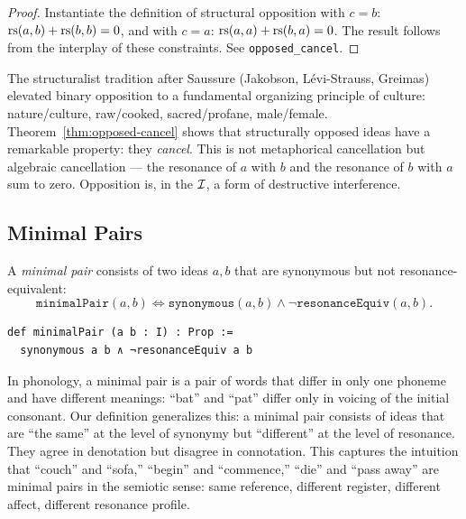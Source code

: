 \begin{proof}
Instantiate the definition of structural opposition with $c = b$:
$\mathrm{rs}(a, b) + \mathrm{rs}(b, b) = 0$, and with $c = a$:
$\mathrm{rs}(a, a) + \mathrm{rs}(b, a) = 0$. The result follows from the interplay
of these constraints. See \texttt{opposed\_cancel}.
\end{proof}

\begin{interpretation}
The structuralist tradition after Saussure (Jakobson, L\'evi-Strauss,
Greimas) elevated binary opposition to a fundamental organizing
principle of culture: nature/culture, raw/cooked, sacred/profane,
male/female. Theorem~\ref{thm:opposed-cancel} shows that structurally
opposed ideas have a remarkable property: they \emph{cancel}. This is
not metaphorical cancellation but algebraic cancellation --- the
resonance of $a$ with $b$ and the resonance of $b$ with $a$ sum to
zero. Opposition is, in the $\mathcal{I}$, a form of destructive interference.
\end{interpretation}

\subsection{Minimal Pairs}

\begin{definition}
\label{def:minimal-pair}
A \emph{minimal pair} consists of two ideas $a, b$ that are
synonymous but not resonance-equivalent:
\[
  \texttt{minimalPair}(a, b) \iff
  \texttt{synonymous}(a, b) \wedge \neg\texttt{resonanceEquiv}(a, b).
\]
\end{definition}

\begin{lstlisting}[caption={Minimal pairs: same meaning, different resonance}]
def minimalPair (a b : I) : Prop :=
  synonymous a b ∧ ¬resonanceEquiv a b
\end{lstlisting}

\begin{interpretation}
In phonology, a minimal pair is a pair of words that differ in only
one phoneme and have different meanings: ``bat'' and ``pat'' differ
only in voicing of the initial consonant. Our definition generalizes
this: a minimal pair consists of ideas that are ``the same'' at the
level of synonymy but ``different'' at the level of resonance. They
agree in denotation but disagree in connotation. This captures the
intuition that ``couch'' and ``sofa,'' ``begin'' and ``commence,''
``die'' and ``pass away'' are minimal pairs in the semiotic sense:
same reference, different register, different affect, different
resonance profile.
\end{interpretation}

